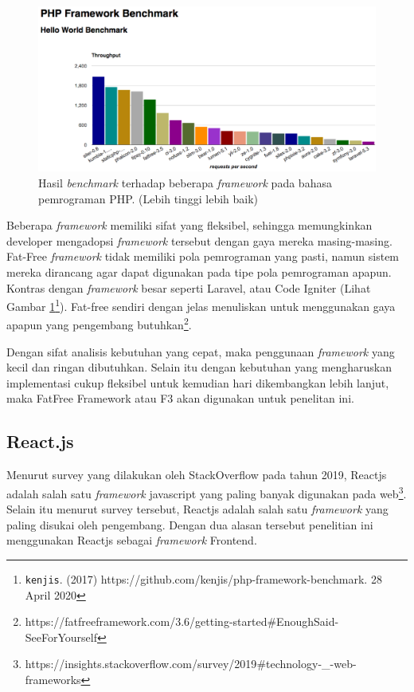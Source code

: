 \begin{figure}[]
    \centering
    \includegraphics[width=0.6\paperwidth]{Gambar/php-framework-benchmark-20170214.png}
    \caption{Hasil \textit{benchmark} terhadap beberapa \textit{framework} pada
        bahasa pemrograman PHP. (Lebih
        tinggi lebih baik)}
    \label{fig:chart-benchmark-php-framework}
\end{figure}

Beberapa \textit{framework} memiliki sifat yang fleksibel, sehingga memungkinkan
developer mengadopsi \textit{framework} tersebut dengan gaya mereka masing-masing.
Fat-Free \textit{framework} tidak memiliki pola pemrograman yang pasti, namun sistem
mereka dirancang agar dapat digunakan pada tipe pola pemrograman apapun. Kontras
dengan \textit{framework} besar seperti Laravel, atau Code Igniter (Lihat Gambar
\ref{fig:chart-benchmark-php-framework}\footnote{\texttt{kenjis}. (2017)
https://github.com/kenjis/php-framework-benchmark. 28 April 2020}). Fat-free sendiri
dengan jelas menuliskan untuk menggunakan gaya apapun yang pengembang
butuhkan\footnote{https://fatfreeframework.com/3.6/getting-started\#EnoughSaid-SeeForYourself}.
 
Dengan sifat analisis kebutuhan yang cepat, maka penggunaan \textit{framework} yang kecil
dan ringan dibutuhkan. Selain itu dengan kebutuhan yang mengharuskan
implementasi cukup fleksibel untuk kemudian hari dikembangkan lebih lanjut, maka
FatFree Framework atau F3 akan digunakan untuk penelitan ini.

\subsection{React.js}
    Menurut survey yang dilakukan oleh StackOverflow pada tahun 2019, Reactjs
    adalah salah satu \textit{framework} javascript yang paling banyak digunakan
    pada
    web\footnote{https://insights.stackoverflow.com/survey/2019{\#}technology-{\_}-web-frameworks}.
    Selain itu menurut survey tersebut, Reactjs adalah salah satu \textit{framework} yang
    paling disukai oleh pengembang. Dengan dua alasan tersebut penelitian ini
    menggunakan Reactjs sebagai \textit{framework} Frontend.

